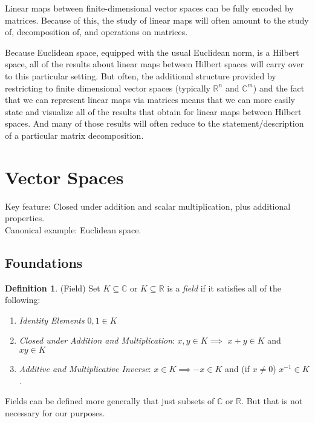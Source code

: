 \documentclass[12pt]{book}
\numberwithin{equation}{section} %
\theoremstyle{plain}
\theoremstyle{definition}
\newtheorem{defn}[thm]{Definition}
\theoremstyle{remark}
\newcommand{\R}{\mathbb{R}}
\newcommand{\Rn}{\mathbb{R}^n}
\newcommand{\C}{\mathbb{C}}
\begin{document}
Linear maps between finite-dimensional vector spaces can be fully
encoded by matrices.
Because of this, the study of linear maps will often amount to the
study of, decomposition of, and operations on matrices.

Because Euclidean space, equipped with the usual Euclidean norm, is a
Hilbert space, all of the results about linear maps between Hilbert
spaces will carry over to this particular setting.
But often, the additional structure provided by restricting to finite
dimensional vector spaces (typically $\Rn$ and $\C^m$) and the fact that
we can represent linear maps via matrices means that we can more easily
state and visualize all of the results that obtain for linear maps
between Hilbert spaces.
And many of those results will often reduce to the statement/description
of a particular matrix decomposition.


\section{Vector Spaces}

Key feature: Closed under addition and scalar multiplication, plus
additional properties.
\\
Canonical example:
Euclidean space.


\subsection{Foundations}


\begin{defn}(Field)
Set $K\subseteq \C$ or $K\subseteq\R$ is a \emph{field} if it satisfies
all of the following:
\begin{enumerate}[label=(\roman*)] \item \emph{Identity Elements} $0,1\in K$
  \item \emph{Closed under Addition and Multiplication}:
      $x,y\in K \implies$ $x+y\in K$ and $xy\in K$
  \item \emph{Additive and Multiplicative Inverse}:
    $x\in K \implies -x\in K$
    and (if $x\neq 0$) $x^{-1}\in K$.
\end{enumerate}
Fields can be defined more generally that just subsets of $\C$ or $\R$.
But that is not necessary for our purposes.
\end{defn}
\end{document}
